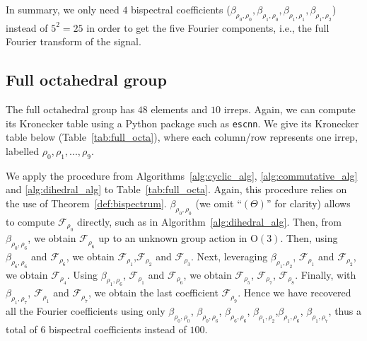 \documentclass{article}
\theoremstyle{plain}
\theoremstyle{definition}
\theoremstyle{remark}
\begin{document}
In summary, we only need $4$ bispectral coefficients ($\beta_{\rho_0, \rho_0}, \beta_{\rho_1, \rho_0}, \beta_{\rho_1, \rho_1}, \beta_{\rho_1, \rho_2}$) instead of $5^2 = 25$ in order to get the five Fourier components, i.e., the full Fourier transform of the signal.
\subsection{Full octahedral group}
The full octahedral group has $48$ elements and $10$ irreps. Again, we can compute its Kronecker table using a Python package such as \texttt{escnn}. We give its Kronecker table below (Table~\ref{tab:full_octa}), where each column/row represents one irrep, labelled $\rho_0, \rho_1, ..., \rho_{9}$.

We apply the procedure from Algorithms~\ref{alg:cyclic_alg}, \ref{alg:commutative_alg} and \ref{alg:dihedral_alg} to Table~\ref{tab:full_octa}. Again, this procedure relies on the use of Theorem~\ref{def:bispectrum}. $\beta_{\rho_0,\rho_0}$ (we omit ``$(\Theta)$'' for clarity) allows to compute $\mathcal{F}_{\rho_0}$ directly, such as in Algorithm~\ref{alg:dihedral_alg}. Then, from $\beta_{\rho_0,\rho_6}$, we obtain $\mathcal{F}_{\rho_6}$ up to an unknown group action in $\mathrm{O}(3)$. Then, using $\beta_{\rho_6,\rho_6}$ and $\mathcal{F}_{\rho_6}$, we obtain $\mathcal{F}_{\rho_1}$,$\mathcal{F}_{\rho_2}$ and $\mathcal{F}_{\rho_ 3}$. Next, leveraging $\beta_{\rho_1,\rho_2}$, $\mathcal{F}_{\rho_1}$ and $\mathcal{F}_{\rho_2}$, we obtain  $\mathcal{F}_{\rho_4}$. Using $\beta_{\rho_1,\rho_6}$, $\mathcal{F}_{\rho_1}$ and $\mathcal{F}_{\rho_6}$, we obtain  $\mathcal{F}_{\rho_5}$, $\mathcal{F}_{\rho_7}$, $\mathcal{F}_{\rho_8}$. Finally, with $\beta_{\rho_1,\rho_7}$, $\mathcal{F}_{\rho_1}$ and $\mathcal{F}_{\rho_7}$, we obtain the last coefficient $\mathcal{F}_{\rho_9}$. Hence we have recovered all the Fourier coefficients using only $\beta_{\rho_0,\rho_0}$, $\beta_{\rho_0,\rho_6}$, $\beta_{\rho_6,\rho_6}$, $\beta_{\rho_1,\rho_2}$,$\beta_{\rho_1,\rho_6}$, $\beta_{\rho_1,\rho_7}$, thus a total of $6$ bispectral coefficients instead of $100$.
\end{document}
